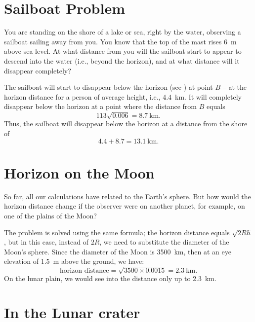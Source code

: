 \section{Sailboat Problem}
\label{sec-6.9}

\ques You are standing on the shore of a lake or sea, right by the water, observing a sailboat sailing away from you. You know that the top of the mast rises \SI{6}{\meter} above sea level. At what distance from you will the sailboat start to appear to descend into the water (i.e., beyond the horizon), and at what distance will it disappear completely?

\ans The sailboat will start to disappear below the horizon (see ) at point $B$ -- at the horizon distance for a person of average height, i.e., \SI{4.4}{\kilo\meter}. It will completely disappear below the horizon at a point where the distance from $B$ equals 
\begin{equation*}%
113\sqrt{0.006} = \SI{8.7}{\kilo\meter}. 
\end{equation*}
Thus, the sailboat will disappear below the horizon at a distance from the shore of 
\begin{equation*}%
4.4 + 8.7 = \SI{13.1}{\kilo\meter}. 
\end{equation*}


\section{Horizon on the Moon}
\label{sec-6.10}

\ques So far, all our calculations have related to the Earth's sphere. But how would the horizon distance change if the observer were on another planet, for example, on one of the plains of the Moon?


\ans The problem is solved using the same formula; the horizon distance equals $\sqrt{2Rh}$, but in this case, instead of $2R$, we need to substitute the diameter of the Moon's sphere. Since the diameter of the Moon is \SI{3500}{\kilo\meter}, then at an eye elevation of \SI{1.5}{\meter} above the ground, we have:
\begin{equation*}%
\text{horizon distance} = \sqrt{3500 \times 0.0015} = \SI{2.3}{\kilo\meter}.
\end{equation*}
On the lunar plain, we would see into the distance only up to \SI{2.3}{\kilo\meter}.


\section{In the Lunar crater}
\label{sec-6.11}

